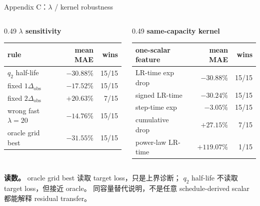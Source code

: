 \documentclass[9pt,aspectratio=169,fontset=fandol]{ctexbeamer}
\begin{document}
\begin{frame}{Appendix C：\(\lambda\) / kernel robustness}
\scriptsize
\begin{columns}[T]
\begin{column}{0.49\textwidth}
\textbf{\(\lambda\) sensitivity}
\begin{tabular}{lrr}
\toprule
rule & mean MAE & wins\\
\midrule
\(q_2\) half-life & \(-30.88\%\) & 15/15\\
fixed \(1\Delta_{\mathrm{obs}}\) & \(-17.52\%\) & 15/15\\
fixed \(2\Delta_{\mathrm{obs}}\) & \(+20.63\%\) & 7/15\\
wrong fast \(\lambda=20\) & \(-14.76\%\) & 15/15\\
oracle grid best & \(-31.55\%\) & 15/15\\
\bottomrule
\end{tabular}
\end{column}
\begin{column}{0.49\textwidth}
\textbf{same-capacity kernel}
\begin{tabular}{lrr}
\toprule
one-scalar feature & mean MAE & wins\\
\midrule
LR-time exp drop & \(-30.88\%\) & 15/15\\
signed LR-time & \(-30.24\%\) & 15/15\\
step-time exp & \(-3.05\%\) & 15/15\\
cumulative drop & \(+27.15\%\) & 7/15\\
power-law LR-time & \(+119.07\%\) & 1/15\\
\bottomrule
\end{tabular}
\end{column}
\end{columns}
\vfill
\small
\textbf{读数。}
oracle grid best 读取 target loss，只是上界诊断；
\(q_2\) half-life 不读取 target loss，但接近 oracle。
同容量替代说明，不是任意 schedule-derived scalar 都能解释 residual transfer。
\end{frame}
\end{document}
